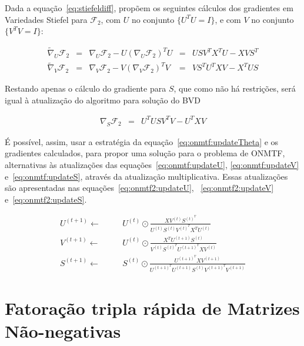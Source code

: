 \documentclass[
    12pt,                %
    oneside,            %
    a4paper,            %
    english,            %
    brazil                %
    ]{abntex2ppgsi}
\begin{document}
Dada a equação~\ref{eq:stiefeldiff},  propõem os seguintes cálculos dos gradientes em Variedades Stiefel para $\mathcal{F}_2$, com $U$ no conjunto $\{ U^T U = I \}$, e com $V$ no conjunto $\{ V^T V = I \}$:

\[
    \begin{array}{lclclclcl}
        {\tilde \nabla_U} \mathcal{F}_2 & = & \nabla_U \mathcal{F}_2 - U (\nabla_U \mathcal{F}_2)^T U & = & U S V^T X^T U - X V S^T \\
        {\tilde \nabla_V} \mathcal{F}_2 & = & \nabla_V \mathcal{F}_2 - V (\nabla_V \mathcal{F}_2)^T V & = & V S^T U^T X V - X^T U S
    \end{array}
\]

Restando apenas o cálculo do gradiente para $S$, que como não há restrições, será igual à atualização do algoritmo para solução do BVD

\[
    \begin{array}{lcl}
        \nabla_S \mathcal{F}_2 & = & U^T U S V^T V - U^T X V
    \end{array}
\]

É possível, assim, usar a estratégia da equação~\ref{eq:onmtf:updateTheta} e os gradientes calculados, para propor uma solução para o problema de ONMTF, alternativas às atualizações das equações~\ref{eq:onmtf:updateU}, \ref{eq:onmtf:updateV} e~\ref{eq:onmtf:updateS}, através da atualização multiplicativa.
Essas atualizações são apresentadas nas equações~\ref{eq:onmtf2:updateU}, ~\ref{eq:onmtf2:updateV} e~\ref{eq:onmtf2:updateS}.

\begin{subequations}
    \begin{alignat}{2}
        U^{(t+1)} \gets \quad && U^{(t)} \odot \frac{ X V^{(t)} S^{(t)^T} }{ U^{(t)} S^{(t)} V^{(t)^T} X^T U^{(t)} }                   \label{eq:onmtf2:updateU} \\
        V^{(t+1)} \gets \quad && U^{(t)} \odot \frac{ X^T U^{(t+1)} S^{(t)} }{ V^{(t)} S^{(t)^T} U^{(t+1)^T} X V^{(t)} }               \label{eq:onmtf2:updateV} \\
        S^{(t+1)} \gets \quad && S^{(t)} \odot \frac{ U^{(t+1)^T} X V^{(t+1)} }{ U^{(t+1)^T} U^{(t+1)} S^{(t)} V^{(t+1)^T} V^{(t+1)} } \label{eq:onmtf2:updateS}
    \end{alignat}
\end{subequations}


\section{Fatoração tripla rápida de Matrizes Não-negativas}
\end{document}
